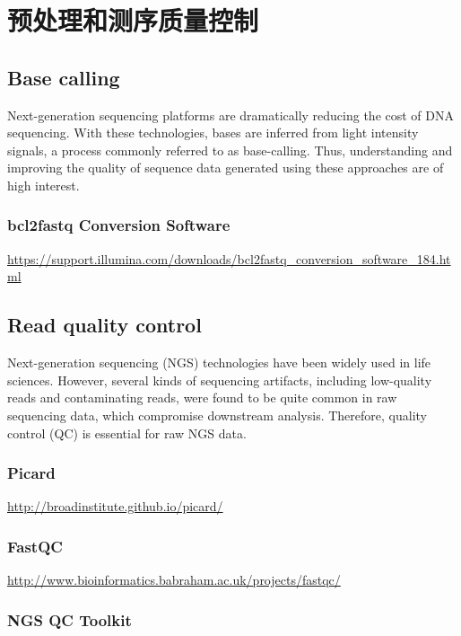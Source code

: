 \chapter{预处理和测序质量控制}

\section{Base calling}

Next-generation sequencing platforms are dramatically reducing the cost of DNA sequencing. With these technologies, bases are inferred from light intensity signals, a process commonly referred to as base-calling. Thus, understanding and improving the quality of sequence data generated using these approaches are of high interest.

\subsection{bcl2fastq Conversion Software}

\url{https://support.illumina.com/downloads/bcl2fastq_conversion_software_184.html}

\section{Read quality control}

Next-generation sequencing (NGS) technologies have been widely used in life sciences. However, several kinds of sequencing artifacts, including low-quality reads and contaminating reads, were found to be quite common in raw sequencing data, which compromise downstream analysis. Therefore, quality control (QC) is essential for raw NGS data.

\subsection{Picard}

\url{http://broadinstitute.github.io/picard/}

\subsection{FastQC}

\url{http://www.bioinformatics.babraham.ac.uk/projects/fastqc/}

\subsection{NGS QC Toolkit}

